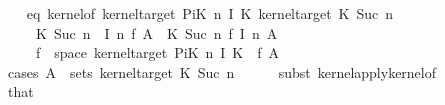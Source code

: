 \begin{isabellebody}
\ \ \isamarkupfalse%
\ eq{\isacharcolon}{\kern0pt}\ {\isachardoublequoteopen}{\isacharparenleft}{\kern0pt}kernel{\isacharunderscore}{\kern0pt}of\ {\isacharparenleft}{\kern0pt}kernel{\isacharunderscore}{\kern0pt}target\ {\isacharparenleft}{\kern0pt}PiK\ n\ I\ K{\isacharparenright}{\kern0pt}{\isacharparenright}{\kern0pt}\ {\isacharparenleft}{\kern0pt}kernel{\isacharunderscore}{\kern0pt}target\ {\isacharparenleft}{\kern0pt}{\isacharquery}{\kern0pt}K\ {\isacharparenleft}{\kern0pt}Suc\ n{\isacharparenright}{\kern0pt}{\isacharparenright}{\kern0pt}{\isacharparenright}{\kern0pt}\isanewline
\ \ \ \ {\isacharparenleft}{\kern0pt}{\isasymlambda}{\isasymomega}{\isachardot}{\kern0pt}\ {\isacharquery}{\kern0pt}K\ {\isacharparenleft}{\kern0pt}Suc\ n{\isacharparenright}{\kern0pt}\ {\isacharparenleft}{\kern0pt}{\isasymomega}\ {\isacharparenleft}{\kern0pt}I\ n{\isacharparenright}{\kern0pt}{\isacharparenright}{\kern0pt}{\isacharparenright}{\kern0pt}{\isacharparenright}{\kern0pt}\ {\isasymomega}\isactrlsub f\ A{\isacharprime}{\kern0pt}\ {\isacharequal}{\kern0pt}\ {\isacharparenleft}{\kern0pt}{\isacharquery}{\kern0pt}K\ {\isacharparenleft}{\kern0pt}Suc\ n{\isacharparenright}{\kern0pt}{\isacharparenright}{\kern0pt}\ {\isacharparenleft}{\kern0pt}{\isasymomega}\isactrlsub f\ {\isacharparenleft}{\kern0pt}I\ n{\isacharparenright}{\kern0pt}{\isacharparenright}{\kern0pt}\ A{\isacharprime}{\kern0pt}{\isachardoublequoteclose}\isanewline
\ \ \ \ \ {\isachardoublequoteopen}{\isasymomega}\isactrlsub f\ {\isasymin}\ space\ {\isacharparenleft}{\kern0pt}kernel{\isacharunderscore}{\kern0pt}target\ {\isacharparenleft}{\kern0pt}PiK\ n\ I\ K{\isacharparenright}{\kern0pt}{\isacharparenright}{\kern0pt}{\isachardoublequoteclose}\ \ {\isasymomega}\isactrlsub f\ A{\isacharprime}{\kern0pt}\isanewline
\ \ \ \ \isamarkupfalse%
\ {\isacharparenleft}{\kern0pt}cases\ {\isachardoublequoteopen}A{\isacharprime}{\kern0pt}\ {\isasymin}\ sets\ {\isacharparenleft}{\kern0pt}kernel{\isacharunderscore}{\kern0pt}target\ {\isacharparenleft}{\kern0pt}{\isacharquery}{\kern0pt}K\ {\isacharparenleft}{\kern0pt}Suc\ n{\isacharparenright}{\kern0pt}{\isacharparenright}{\kern0pt}{\isacharparenright}{\kern0pt}{\isachardoublequoteclose}{\isacharparenright}{\kern0pt}\isanewline
\ \ \ \ \isamarkupfalse%
\ {\isacharparenleft}{\kern0pt}subst\ kernel{\isacharunderscore}{\kern0pt}apply{\isacharunderscore}{\kern0pt}kernel{\isacharunderscore}{\kern0pt}of{\isacharparenright}{\kern0pt}\isanewline
\ \ \ \ \ \ \ \isamarkupfalse%
\ that\ \isamarkupfalse%

\end{isabellebody}
